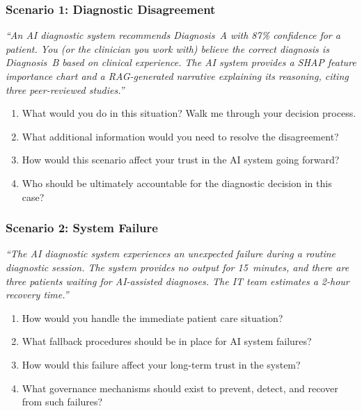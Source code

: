 \subsubsection{Scenario 1: Diagnostic Disagreement}

\noindent\textit{``An AI diagnostic system recommends Diagnosis~A with 87\% confidence for a patient. You (or the clinician you work with) believe the correct diagnosis is Diagnosis~B based on clinical experience. The AI system provides a SHAP feature importance chart and a RAG-generated narrative explaining its reasoning, citing three peer-reviewed studies.''}

\begin{enumerate}[label=\textbf{MS1.\arabic*.}, leftmargin=2.5cm]
    \item What would you do in this situation? Walk me through your decision process.
    \item What additional information would you need to resolve the disagreement?
    \item How would this scenario affect your trust in the AI system going forward?
    \item Who should be ultimately accountable for the diagnostic decision in this case?
\end{enumerate}

\subsubsection{Scenario 2: System Failure}

\noindent\textit{``The AI diagnostic system experiences an unexpected failure during a routine diagnostic session. The system provides no output for 15~minutes, and there are three patients waiting for AI-assisted diagnoses. The IT team estimates a 2-hour recovery time.''}

\begin{enumerate}[label=\textbf{MS2.\arabic*.}, leftmargin=2.5cm]
    \item How would you handle the immediate patient care situation?
    \item What fallback procedures should be in place for AI system failures?
    \item How would this failure affect your long-term trust in the system?
    \item What governance mechanisms should exist to prevent, detect, and recover from such failures?
\end{enumerate}

